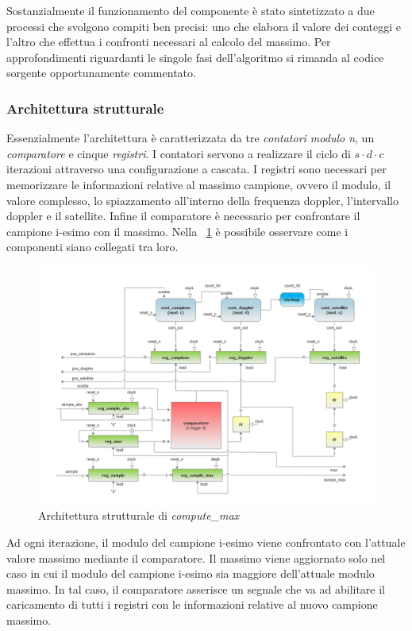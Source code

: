 \documentclass[12pt,a4paper,twoside,openany]{book}
\begin{document}
Sostanzialmente il funzionamento del componente è stato sintetizzato a due processi che svolgono compiti ben precisi: uno che elabora il valore dei conteggi e l'altro che effettua i confronti necessari al calcolo del massimo. Per approfondimenti riguardanti le singole fasi dell'algoritmo si rimanda al codice sorgente opportunamente commentato.

\clearpage
\subsubsection{Architettura strutturale}
Essenzialmente l'architettura è caratterizzata da tre \textit{contatori modulo n}, un \textit{comparatore} e cinque \textit{registri}. I contatori servono a realizzare il ciclo di $s \cdot d \cdot c$ iterazioni attraverso una configurazione a cascata. I registri sono necessari per memorizzare le informazioni relative al massimo campione, ovvero il modulo, il valore complesso, lo spiazzamento all'interno della frequenza doppler, l'intervallo doppler e il satellite. Infine il comparatore è necessario per confrontare il campione i-esimo con il massimo. Nella \figurename~\ref{computemax_schema} è possibile osservare come i componenti siano collegati tra loro.

\begin{figure}
\includegraphics[scale=0.55, keepaspectratio]{immagini/computemax_schemablocchi}
\caption{Architettura strutturale di \textit{compute\_max}}
\label{computemax_schema}
\end{figure}

Ad ogni iterazione, il modulo del campione i-esimo viene confrontato con l'attuale valore massimo mediante il comparatore. Il massimo viene aggiornato solo nel caso in cui il modulo del campione i-esimo sia maggiore dell'attuale modulo massimo. In tal caso, il comparatore asserisce un segnale che va ad abilitare il caricamento di tutti i registri con le informazioni relative al nuovo campione massimo.
\end{document}

